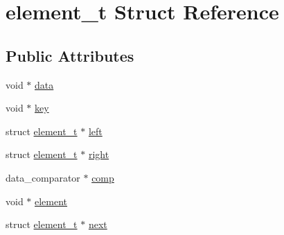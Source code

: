 \hypertarget{structelement__t}{\section{element\-\_\-t Struct Reference}
\label{structelement__t}
}
\subsection*{Public Attributes}
\begin{DoxyCompactItemize}
\item 
void $\ast$ \hyperlink{structelement__t_a40f42c98500e0c8cb258c2f8fac7fdf2}{data}
\item 
void $\ast$ \hyperlink{structelement__t_a3b62ab0ad40417ea023da490e9bb19d8}{key}
\item 
struct \hyperlink{structelement__t}{element\-\_\-t} $\ast$ \hyperlink{structelement__t_a68b10a17bd169bb5f4ac8498f9759a63}{left}
\item 
struct \hyperlink{structelement__t}{element\-\_\-t} $\ast$ \hyperlink{structelement__t_a70eb387a3bcf9feead2cb2b5d4646353}{right}
\item 
data\-\_\-comparator $\ast$ \hyperlink{structelement__t_a46ae4bd6ebad05a5b4baacd212bc3c72}{comp}
\item 
void $\ast$ \hyperlink{structelement__t_aa8f6446dfa11f92299dfcdd7d7ccdaf5}{element}
\item 
struct \hyperlink{structelement__t}{element\-\_\-t} $\ast$ \hyperlink{structelement__t_aa22632b0ef60425293b31465d7f40b43}{next}
\end{DoxyCompactItemize}


